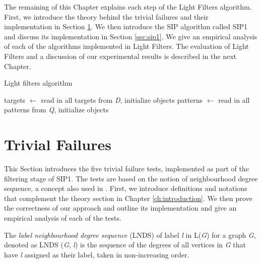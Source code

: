 \documentclass{l4proj}
\begin{document}
The remaining of this Chapter explains each step of the Light Filters algorithm. First, we introduce the theory behind the trivial failures and their implementation in Section \ref{sec:trivialFails}. We then introduce the SIP algorithm called SIP1 and discuss its implementation in Section \ref{sec:sip1}. We give an empirical analysis of each of the algorithms implemented in Light Filters. The evaluation of Light Filters and a discussion of our experimental results is described in the next Chapter.

\begin{algorithm}
\centering
\caption{Light filters algorithm}
\label{algo:roughSIP}
\begin{algorithmic}[1]
\State targets $\gets$ read in all targets from \emph{D}, initialize objects
\State patterns $\gets$ read in all patterns from \emph{Q}, initialize objects
		 
    	\EndIf
    \EndFor
\EndFor
\EndProcedure
\end{algorithmic}
\end{algorithm}

\section{Trivial Failures}
\label{sec:trivialFails}

This Section introduces the five trivial failure tests, implemented as part of the filtering stage of SIP1. The tests are based on the notion of neighbourhood degree sequence, a concept also used in \cite{Solnon:2010}. First, we introduce definitions and notations that complement the theory section in Chapter \ref{ch:introduction}. We then prove the correctness of our approach and outline its implementation and give an empirical analysis of each of the tests.

The \emph{label neighbourhood degree sequence} (LNDS) of label \emph{l} in L(\emph{G}) for a graph \emph{G}, denoted as LNDS (\emph{G}, \emph{l}) is the sequence of the degrees of all vertices in \emph{G} that have \emph{l} assigned as their label, taken in non-increasing order.

\end{document}
